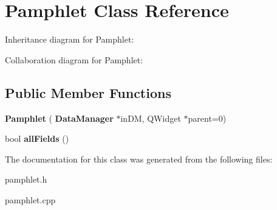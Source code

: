 \section{Pamphlet Class Reference}
\label{class_pamphlet}


Inheritance diagram for Pamphlet\+:


Collaboration diagram for Pamphlet\+:
\subsection*{Public Member Functions}
\begin{DoxyCompactItemize}
\item 
\mbox{\label{class_pamphlet_a1faaf1c58a4df6d46086717c785a517b}} 
{\bfseries Pamphlet} (\textbf{ Data\+Manager} $\ast$in\+DM, Q\+Widget $\ast$parent=0)
\item 
\mbox{\label{class_pamphlet_a14f5d25544eec44204c0949a1452ca7c}} 
bool {\bfseries all\+Fields} ()
\end{DoxyCompactItemize}


The documentation for this class was generated from the following files\+:\begin{DoxyCompactItemize}
\item 
pamphlet.\+h\item 
pamphlet.\+cpp\end{DoxyCompactItemize}
